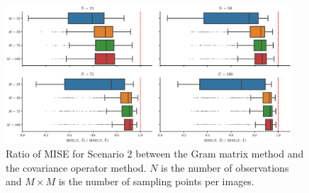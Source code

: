 \begin{results}
\begin{figure}
     \centering
     \includegraphics[width=0.95\textwidth]{figures/scenario_2/mise.eps}
    \caption{Ratio of MISE for Scenario 2 between the Gram matrix method and the covariance operator method. $N$ is the number of observations and $M \times M$ is the number of sampling points per images.}
    \label{fig:mise_mfd_2d}
\end{figure}
\end{results}




